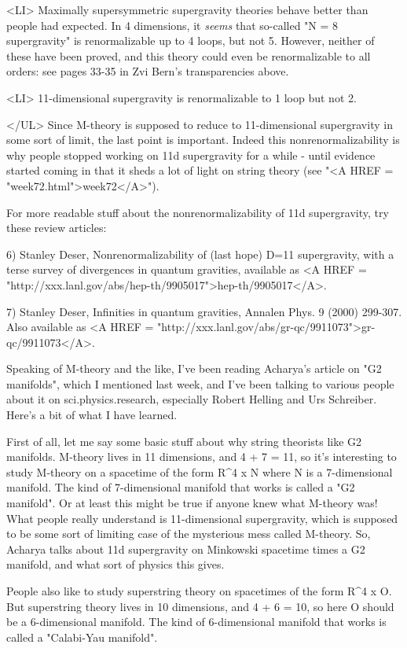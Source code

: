 <LI>
  Maximally supersymmetric supergravity theories behave better
  than people had expected.  In 4 dimensions, it \emph{seems} that
  so-called "N = 8 supergravity" is renormalizable up to 4 loops,
  but not 5.  However, neither of these have been proved, and 
  this theory could even be renormalizable to all orders: 
  see pages 33-35 in Zvi Bern's transparencies above.

<LI>
  11-dimensional supergravity is renormalizable to 1 loop but not 2.

</UL>
Since M-theory is supposed to reduce to 11-dimensional supergravity in
some sort of limit, the last point is important.  Indeed this
nonrenormalizability is why people stopped working on 11d supergravity
for a while - until evidence started coming in that it sheds a lot of
light on string theory (see "<A HREF =
"week72.html">week72</A>").

For more readable stuff about the nonrenormalizability of 11d
supergravity, try these review articles:


6) Stanley Deser, Nonrenormalizability of (last hope) D=11
supergravity, with a terse survey of divergences in quantum gravities,
available as <A HREF =
"http://xxx.lanl.gov/abs/hep-th/9905017">hep-th/9905017</A>.
 

7) Stanley Deser, Infinities in quantum gravities, Annalen Phys.  9
(2000) 299-307.  Also available as <A HREF =
"http://xxx.lanl.gov/abs/gr-qc/9911073">gr-qc/9911073</A>.

Speaking of M-theory and the like, I've been reading Acharya's 
article on "G2 manifolds", which I mentioned last week, and I've 
been talking to various people about it on sci.physics.research, 
especially Robert Helling and Urs Schreiber.  Here's a bit of what 
I have learned.   

First of all, let me say some basic stuff about why string theorists
like G2 manifolds.  M-theory lives in 11 dimensions, and 4 + 7 = 11,
so it's interesting to study M-theory on a spacetime of the form
R^{4} x N where N is a 7-dimensional manifold.  The kind of
7-dimensional manifold that works is called a "G2 manifold".
Or at least this might be true if anyone knew what M-theory was!  What
people really understand is 11-dimensional supergravity, which is
supposed to be some sort of limiting case of the mysterious mess
called M-theory.  So, Acharya talks about 11d supergravity on
Minkowski spacetime times a G2 manifold, and what sort of physics this
gives.

People also like to study superstring theory on spacetimes of the 
form R^{4} x O.  But superstring theory lives in 10 dimensions, and 
4 + 6 = 10, so here O should be a 6-dimensional manifold.  The kind 
of 6-dimensional manifold that works is called a "Calabi-Yau manifold".  

